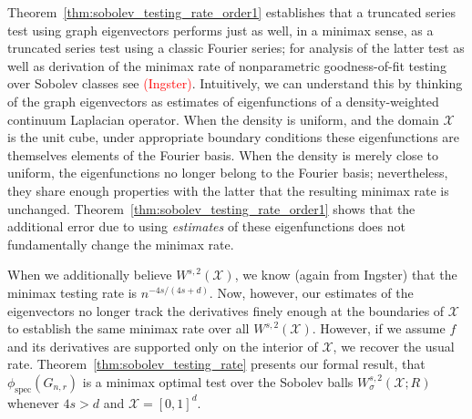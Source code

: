 \documentclass{article}
\newcommand{\1}{\mathbf{1}}
\newcommand{\Xset}{\mathcal{X}}
\theoremstyle{alden}
\theoremstyle{aldenthm}
\theoremstyle{definition}
\theoremstyle{remark}
\begin{document}
Theorem~\ref{thm:sobolev_testing_rate_order1} establishes that a truncated series test using graph eigenvectors performs just as well, in a minimax sense, as a truncated series test using a classic Fourier series; for analysis of the latter test as well as derivation of the minimax rate of nonparametric goodness-of-fit testing over Sobolev classes see \textcolor{red}{(Ingster)}. Intuitively, we can understand this by thinking of the graph eigenvectors as estimates of eigenfunctions of a density-weighted continuum Laplacian operator. When the density is uniform, and the domain $\Xset$ is the unit cube, under appropriate boundary conditions these eigenfunctions are themselves elements of the Fourier basis. When the density is merely close to uniform, the eigenfunctions no longer belong to the Fourier basis; nevertheless, they share enough properties with the latter that the resulting minimax rate is unchanged. Theorem~\ref{thm:sobolev_testing_rate_order1} shows that the additional error due to using \textit{estimates} of these eigenfunctions does not fundamentally change the minimax rate. 

When we additionally believe $W^{s,2}(\Xset)$, we know (again from Ingster) that the minimax testing rate is $n^{-4s/(4s + d)}$. Now, however, our estimates of the eigenvectors no longer track the derivatives finely enough at the boundaries of $\Xset$ to establish the same minimax rate over all $W^{s,2}(\mathcal{X})$. However, if we assume $f$ and its derivatives are supported only on the interior of $\mathcal{X}$, we recover the usual rate. Theorem~\ref{thm:sobolev_testing_rate} presents our formal result, that $\phi_{\textrm{spec}}(G_{n,r})$ is a minimax optimal test over the Sobolev balls $W_{\sigma}^{s,2}(\mathcal{X};R)$ whenever $4s > d$ and $\Xset = [0,1]^d$.
\end{document}
